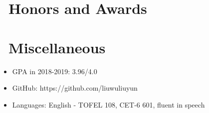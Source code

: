 \documentclass{resume}
\begin{document}

\section{\faHeartO\ Honors and Awards}

\section{\faInfo\ Miscellaneous}
\begin{itemize}[parsep=0.5ex]
  \item GPA in 2018-2019: 3.96/4.0
  \item GitHub: https://github.com/liuwuliuyun
  \item Languages: English - TOFEL 108, CET-6 601, fluent in speech
\end{itemize}

%
%
\end{document}
